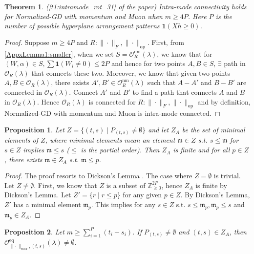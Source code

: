 \documentclass{article}
\newtheorem{theorem}{Theorem}[section]
\newtheorem{proposition}{Proposition}[section]
\newcommand{\op}{\mathrm{op}}
\newcommand{\nm}{\mathrm{nm}}      %
\newcommand{\eq}{\mathrm{eq}}      %
\begin{document}
\begin{theorem}
\label{t1:intramode_rot} (\cref{t1:intramode_rot_31} of the paper)
Intra-mode connectivity holds for Normalized-GD with momentum and Muon when $m \ge 4P$. Here $P$ is the number of possible hyperplane arrangement patterns $\mathbf{1}(Xh \ge 0)$.
\end{theorem}
\begin{proof}
Suppose $m \ge 4P$ and $R: \|\cdot\|_F, \|\cdot\|_{\op}$. First, from \cref{AppxLemma1:smaller}, when we set $S = \mathcal{O}_R^{\nm}(\lambda)$, we know that for $(W, \alpha) \in S, \sum \mathbf{1}(W_i \ne 0) \le 2P$ and hence for two points $A, B \in S$, $\exists$ path in $\mathcal{O}_R(\lambda)$ that connects these two. Moreover, we know that given two points $A, B \in \mathcal{O}_R(\lambda)$, there exists $A', B' \in \mathcal{O}_R^{\nm}(\lambda)$ such that $A - A'$ and $B - B'$ are connected in $\mathcal{O}_R(\lambda)$. Connect $A'$ and $B'$ to find a path that connects $A$ and $B$ in $\mathcal{O}_R(\lambda)$. Hence $\mathcal{O}_R(\lambda)$ is connected for $R: \|\cdot\|_F, \|\cdot\|_{\op}$ and by definition, Normalized-GD with momentum and Muon is intra-mode connected.
\end{proof}

\begin{proposition}
\label{Prop5:Dickson}
Let $Z = \{ (t, s) \mid P_{(t, s)} \ne \emptyset \}$ and let $Z_A$ be the set of minimal elements of $Z$, where minimal elements mean an element $\mathfrak{m} \in Z$ s.t. $s \le \mathfrak{m}$ for $s \in Z$ implies $\mathfrak{m} \le s$ ($\le$ is the partial order). Then $Z_A$ is finite and for all $p \in Z$, there exists $\mathfrak{m} \in Z_A$ s.t. $\mathfrak{m} \le p$.
\end{proposition}

\begin{proof}
The proof resorts to Dickson's Lemma \cite{dickson1913finiteness}. The case where $Z = \emptyset$ is trivial. Let $Z \neq \emptyset$. First, we know that $Z$ is a subset of $\mathbb{Z}_{\ge 0}^{2P}$, hence $Z_A$ is finite by Dickson's Lemma. Let $Z' = \{ r \mid r \le p \}$ for any given $p \in Z$. By Dickson's Lemma, $Z'$ has a minimal element $\mathfrak{m}_p$. This implies for any $s \in Z$ s.t. $s \le \mathfrak{m}_p, \mathfrak{m}_p \le s$ and $\mathfrak{m}_p \in Z_A$.
\end{proof}

\begin{proposition}
\label{prop4:connectPandTh}
Let $m \ge \sum_{i=1}^P (t_i + s_i)$. If $P_{(t, s)} \ne \emptyset$ and $(t,s) \in Z_A$, then $\mathcal{O}_{\|\cdot\|_{\max}, (t, s)}^{\eq}(\lambda) \ne \emptyset$.
\end{proposition}
\end{document}
